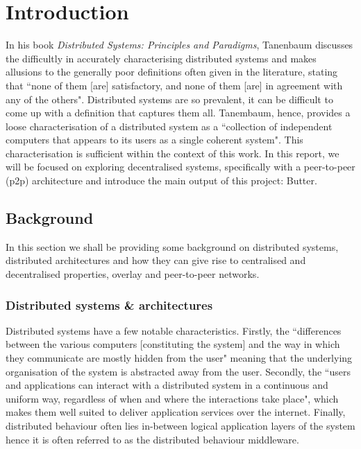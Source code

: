 \chapter{Introduction}
\label{ch:introduction}


In his book \textit{Distributed Systems: Principles and Paradigms}, Tanenbaum discusses the difficultly in accurately characterising distributed systems and makes allusions to the generally poor definitions often given in the literature, stating that ``none of them [are] satisfactory, and none of them [are] in agreement with any of the others". Distributed systems are so prevalent, it can be difficult to come up with a definition that captures them all. Tanembaum, hence, provides a loose characterisation of a distributed system as a ``collection of independent computers that appears to its users as a single coherent system". This characterisation is sufficient within the context of this work. In this report, we will be focused on exploring decentralised systems, specifically with a peer-to-peer (p2p) architecture and introduce the main output of this project: Butter.\cite{tanenbaum2007distributed}


\section{Background}
\label{sec:background}

In this section we shall be providing some background on distributed systems, distributed architectures and how they can give rise to centralised and decentralised properties, overlay and peer-to-peer networks.

\subsection{Distributed systems \& architectures}
\label{subsec:distributedSystemsArchitectures}

Distributed systems have a few notable characteristics. Firstly, the ``differences between the various computers [constituting the system] and the way in which they communicate are mostly hidden from the user" meaning that the underlying organisation of the system is abstracted away from the user. Secondly, the ``users and applications can interact with a distributed system in a continuous and uniform way, regardless of when and where the interactions take place", which makes them well suited to deliver application services over the internet. Finally, distributed behaviour often lies in-between logical application layers of the system hence it is often referred to as the distributed behaviour middleware.\cite{tanenbaum2007distributed}

